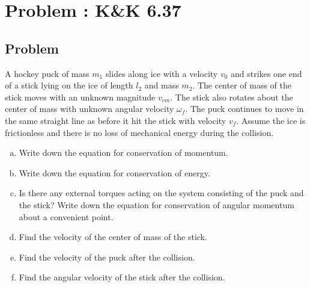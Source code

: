 \documentclass[solutions]{esg8012pset}
\begin{document}
\section{Problem \thesection: K\&K 6.37}
\subsection{Problem}
  A hockey puck of mass $m_1$ slides along ice with a velocity $v_0$ and strikes one end of a stick lying on the ice of length $l_2$ and mass $m_2$. The center of mass of the stick moves with an unknown magnitude $v_{cm}$. The stick also rotates about the center of mass with unknown angular velocity $\omega_{f}$. The puck continues to move in the same straight line as before it hit the stick with velocity $v_f$. Assume the ice is frictionless and there is no loss of mechanical energy during the collision.
  \begin{center}
  \end{center}
  \begin{enumerate}[(a)]
    \item Write down the equation for conservation of momentum.
    \item Write down the equation for conservation of energy.
    \item Is there any external torques acting on the system consisting of the puck and the stick? Write down the equation for conservation of angular momentum about a convenient point.
    \item Find the velocity of the center of mass of the stick.
    \item Find the velocity of the puck after the collision.
    \item Find the angular velocity of the stick after the collision.
  \end{enumerate}
\end{document}
